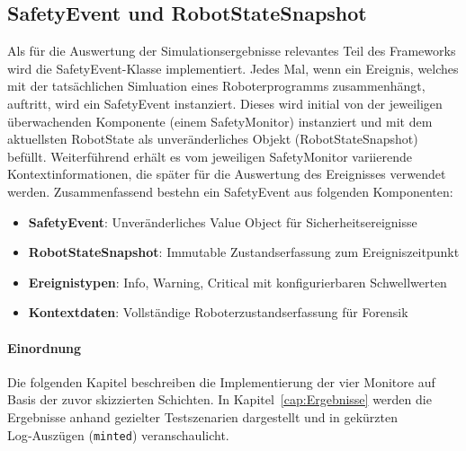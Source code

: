\subsection{SafetyEvent und RobotStateSnapshot}
Als für die Auswertung der Simulationsergebnisse relevantes Teil des Frameworks
wird die SafetyEvent-Klasse implementiert. Jedes Mal, wenn ein Ereignis,
welches mit der tatsächlichen Simluation eines Roboterprogramms zusammenhängt,
auftritt, wird ein SafetyEvent instanziert. Dieses wird initial von der
jeweiligen überwachenden Komponente (einem SafetyMonitor) instanziert und mit
dem aktuellsten RobotState als unveränderliches Objekt
(RobotStateSnapshot) befüllt.
Weiterführend erhält es vom jeweiligen SafetyMonitor variierende
Kontextinformationen, die später für die Auswertung des Ereignisses verwendet
werden. Zusammenfassend bestehn ein SafetyEvent aus folgenden Komponenten:
\begin{itemize}
  \item \textbf{SafetyEvent}: Unveränderliches Value Object für
    Sicherheitsereignisse
  \item \textbf{RobotStateSnapshot}: Immutable Zustandserfassung zum
    Ereigniszeitpunkt
  \item \textbf{Ereignistypen}: Info, Warning, Critical mit
    konfigurierbaren Schwellwerten
  \item \textbf{Kontextdaten}: Vollständige Roboterzustandserfassung
    für Forensik
\end{itemize}

\paragraph{Einordnung}
Die folgenden Kapitel beschreiben die Implementierung der vier
Monitore auf Basis
der zuvor skizzierten Schichten. In Kapitel~\ref{cap:Ergebnisse} werden die
Ergebnisse anhand gezielter Testszenarien dargestellt und in gekürzten
Log‑Auszügen (\texttt{minted}) veranschaulicht.
